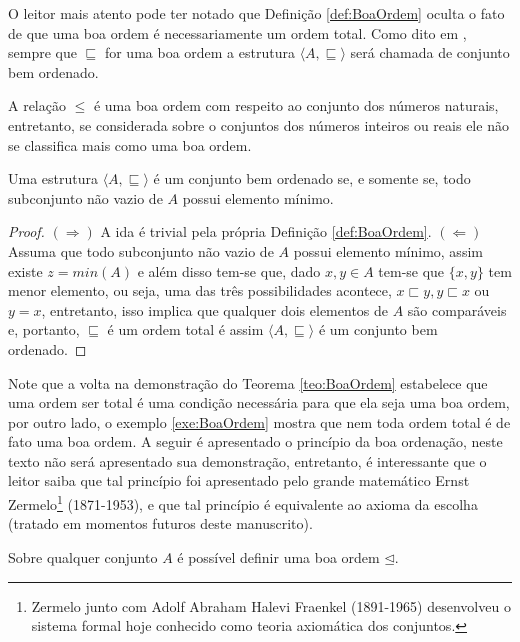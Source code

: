 O leitor mais atento pode ter notado que Definição \ref{def:BoaOrdem} oculta o fato de que uma boa ordem é necessariamente um ordem total. Como dito em \cite{joaoPavao2014}, sempre que $\sqsubseteq$ for uma boa ordem a estrutura $\langle A, \sqsubseteq \rangle$ será chamada de conjunto bem ordenado.

\begin{exemplo}\label{exe:BoaOrdem}
	A relação $\leq$ é uma boa ordem com respeito ao conjunto dos números naturais, entretanto, se considerada sobre o conjuntos dos números inteiros ou reais ele não se classifica mais como uma boa ordem. 
\end{exemplo}

\begin{teorema}\label{teo:BoaOrdem}
	Uma estrutura $\langle A, \sqsubseteq \rangle$  é um conjunto bem ordenado se, e somente se, todo subconjunto não vazio de $A$ possui elemento mínimo.
\end{teorema}

\begin{proof}
	$(\Rightarrow)$ A ida é trivial pela própria Definição \ref{def:BoaOrdem}. $(\Leftarrow)$ Assuma que todo subconjunto não vazio de $A$ possui elemento mínimo, assim existe $z = min(A)$ e além disso tem-se que, dado $x, y \in A$ tem-se que $\{x, y\}$ tem menor elemento, ou seja, uma das três possibilidades acontece, $x \sqsubset y, y \sqsubset x$ ou $y = x$, entretanto, isso implica que qualquer dois elementos de $A$ são comparáveis e, portanto, $\sqsubseteq$ é um ordem total é assim $\langle A, \sqsubseteq \rangle$ é um conjunto bem ordenado.
\end{proof}

Note que a volta na demonstração do Teorema \ref{teo:BoaOrdem} estabelece que uma ordem ser total é uma condição necessária para que ela seja uma boa ordem, por outro lado, o exemplo \ref{exe:BoaOrdem} mostra que nem toda ordem total é de fato uma boa ordem. A seguir é apresentado o princípio da boa ordenação, neste texto não será apresentado sua demonstração, entretanto, é interessante que o leitor saiba que tal princípio foi apresentado pelo grande matemático Ernst Zermelo\footnote{Zermelo junto com Adolf Abraham Halevi Fraenkel (1891-1965) desenvolveu o sistema formal hoje conhecido como teoria axiomática dos conjuntos.} (1871-1953), e que tal princípio é equivalente ao axioma da escolha \cite{carmo2013} (tratado em momentos futuros deste manuscrito).

\begin{principio}\label{pri:BoaOrdenacao}
	Sobre qualquer conjunto $A$ é possível definir uma boa ordem $\unlhd$. 
\end{principio}

